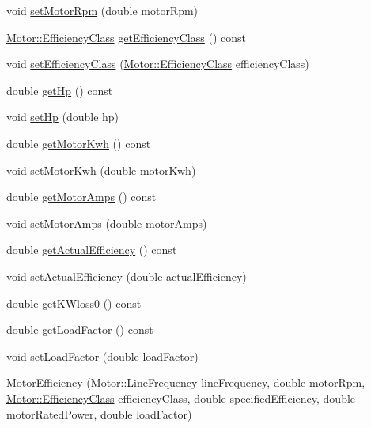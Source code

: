 \begin{DoxyCompactItemize}
\item 
void \hyperlink{class_motor_efficiency_a2c4ddf9f2f3e44c098dad91a0ddbaf21}{set\+Motor\+Rpm} (double motor\+Rpm)
\item 
\hyperlink{class_motor_afa022971ae062406a9f588c601673d4e}{Motor\+::\+Efficiency\+Class} \hyperlink{class_motor_efficiency_a9eb7d5c2fc598f655c1a3d12790e4d17}{get\+Efficiency\+Class} () const
\item 
void \hyperlink{class_motor_efficiency_a1ff4790d01bf2e65bd7bce2edc98d0c5}{set\+Efficiency\+Class} (\hyperlink{class_motor_afa022971ae062406a9f588c601673d4e}{Motor\+::\+Efficiency\+Class} efficiency\+Class)
\item 
double \hyperlink{class_motor_efficiency_a9f88159c82daa270975d7969debe88a9}{get\+Hp} () const
\item 
void \hyperlink{class_motor_efficiency_a4b86113447665413ddbae115199d9b3f}{set\+Hp} (double hp)
\item 
double \hyperlink{class_motor_efficiency_a4d21d0c44ee00f5d097b0acbcb73a8d8}{get\+Motor\+Kwh} () const
\item 
void \hyperlink{class_motor_efficiency_ab1c7507bac259565e43a6777d079148b}{set\+Motor\+Kwh} (double motor\+Kwh)
\item 
double \hyperlink{class_motor_efficiency_a955906509a4b49274b35c1b119c4a4b4}{get\+Motor\+Amps} () const
\item 
void \hyperlink{class_motor_efficiency_ac86aa8d6162e63eb440e07e557534c74}{set\+Motor\+Amps} (double motor\+Amps)
\item 
double \hyperlink{class_motor_efficiency_ae40031307b8631cf40df1c4069069dc0}{get\+Actual\+Efficiency} () const
\item 
void \hyperlink{class_motor_efficiency_a7a5ad8d01fdc0a3bf93d952752487496}{set\+Actual\+Efficiency} (double actual\+Efficiency)
\item 
double \hyperlink{class_motor_efficiency_a47398ac8203f5b79a0ca435673a4bc16}{get\+K\+Wloss0} () const
\item 
double \hyperlink{class_motor_efficiency_abff38d95856c3d33c9c48c45e77e8899}{get\+Load\+Factor} () const
\item 
void \hyperlink{class_motor_efficiency_ad6a7b0eb436378f36ceb8a0cec121786}{set\+Load\+Factor} (double load\+Factor)
\item 
\hyperlink{class_motor_efficiency_ab8d410693e778a2cb2d5a112cc1a4202}{Motor\+Efficiency} (\hyperlink{class_motor_acee1bdf1b684ad36cb80dc2829d9fcee}{Motor\+::\+Line\+Frequency} line\+Frequency, double motor\+Rpm, \hyperlink{class_motor_afa022971ae062406a9f588c601673d4e}{Motor\+::\+Efficiency\+Class} efficiency\+Class, double specified\+Efficiency, double motor\+Rated\+Power, double load\+Factor)

\end{DoxyCompactItemize}

